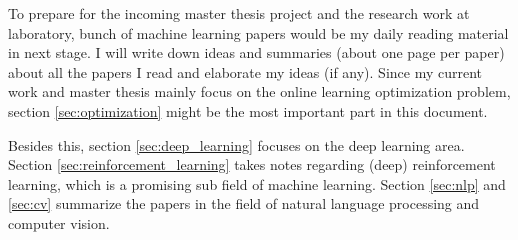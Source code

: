 To prepare for the incoming master thesis project and the research work at laboratory, bunch of machine learning papers would be my daily reading material in next stage. 
I will write down ideas and summaries (about one page per paper) about all the papers I read and elaborate my ideas (if any). 
Since my current work and master thesis mainly focus on the online learning optimization problem, section \ref{sec:optimization} might be the most important part in this document. 

Besides this, section \ref{sec:deep_learning} focuses on the deep learning area. Section \ref{sec:reinforcement_learning} takes notes regarding (deep) reinforcement learning, which is a promising sub field of machine learning. Section \ref{sec:nlp} and \ref{sec:cv} summarize the papers in the field of natural language processing and computer vision. 

